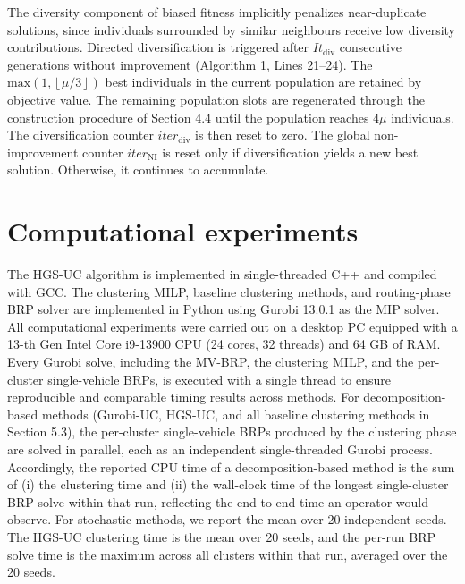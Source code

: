 \documentclass[11pt]{article}
\numberwithin{table}{section}
\numberwithin{figure}{section}
\begin{document}
The diversity component of biased fitness implicitly penalizes near-duplicate solutions, since individuals surrounded by similar neighbours receive low diversity contributions. Directed diversification is triggered after $I{{t}_{\text{div}}}$ consecutive generations without improvement (Algorithm 1, Lines 21–24). The $\text{max}\left( 1,\left\lfloor \mu /3 \right\rfloor  \right)$ best individuals in the current population are retained by objective value. The remaining population slots are regenerated through the construction procedure of Section 4.4 until the population reaches $4\mu $ individuals. The diversification counter $ite{{r}_{\text{div}}}$ is then reset to zero. The global non-improvement counter $ite{{r}_{\text{NI}}}$ is reset only if diversification yields a new best solution. Otherwise, it continues to accumulate.

\section{Computational experiments}

The HGS-UC algorithm is implemented in single-threaded C++ and compiled with GCC. The clustering MILP, baseline clustering methods, and routing-phase BRP solver are implemented in Python using Gurobi 13.0.1 as the MIP solver. All computational experiments were carried out on a desktop PC equipped with a 13-th Gen Intel Core i9-13900 CPU (24 cores, 32 threads) and 64 GB of RAM. Every Gurobi solve, including the MV-BRP, the clustering MILP, and the per-cluster single-vehicle BRPs, is executed with a single thread to ensure reproducible and comparable timing results across methods. For decomposition-based methods (Gurobi-UC, HGS-UC, and all baseline clustering methods in Section 5.3), the per-cluster single-vehicle BRPs produced by the clustering phase are solved in parallel, each as an independent single-threaded Gurobi process. Accordingly, the reported CPU time of a decomposition-based method is the sum of (i) the clustering time and (ii) the wall-clock time of the longest single-cluster BRP solve within that run, reflecting the end-to-end time an operator would observe. For stochastic methods, we report the mean over 20 independent seeds. The HGS-UC clustering time is the mean over 20 seeds, and the per-run BRP solve time is the maximum across all clusters within that run, averaged over the 20 seeds.
\end{document}

